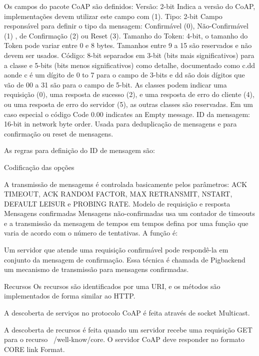 Os campos do pacote CoAP s\~ao definidos:
Vers\~ao: 2-bit Indica a vers\~ao do CoAP, implementa\c{c}\~oes devem utilizar este campo com (1).
Tipo: 2-bit Campo responsável para definir o tipo da mensagem: Confirm\'avel (0), N\~ao-Confirm\'avel (1) , de Confirma\c{c}\~ao (2) ou Reset (3).
Tamanho do Token: 4-bit, o tamanho do Token pode variar entre 0 e 8 bytes. Tamanhos entre 9 a 15 s\~ao reservados e n\~ao devem ser usados.
C\'odigo: 8-bit separados em 3-bit (bits mais significativos) para a classe e 5-bits (bits menos significativos) como detalhe, documentado como c.dd aonde c \'e um d\'igito de 0 to 7 para o campo de 3-bits e dd s\~ao dois d\'igitos que v\~ao de 00 a 31 s\~ao para o campo de 5-bit. As classes podem indicar uma requisi\c{c}\~ao (0), uma resposta de sucesso (2), e uma resposta de erro do cliente (4), ou uma resposta de erro do servidor (5), as outras classes s\~ao reservadas. Em um caso especial o c\'odigo Code 0.00 indicates an Empty message.
ID da mensagem: 16-bit in network byte order. Usada para deduplica\c{c}\~ao de mensagens e para confirmação ou reset de mensagens.

As regras para defini\c{c}\~ao do ID de mensagem s\~ao:
   
Codifica\c{c}\~ao das op\c{c}\~oes

A transmiss\~ao de mensagems \'e controlada basicamente pelos par\^ametros: ACK TIMEOUT, ACK RANDOM FACTOR, MAX RETRANSMIT, NSTART, DEFAULT LEISUR e PROBING RATE.
Modelo de requisi\c{c}\~ao e resposta Mensagens confirmadas Mensagens n\~ao-confirmadas usa um contador de timeouts e a transmiss\~ao da mensagem de tempos em tempos defina por uma fun\c{c}\~ao que varia de acordo com o n\'umero de tentativas. A fun\c{c}\~ao \'e:

Um servidor que atende uma requisi\c{c}\~ao confirm\'avel pode respond\^e-la em conjunto da mensagem de confirma\c{c}\~ao. Essa t\'ecnica \'e chamada de Pigbackend um mecanismo de transmiss\~ao para mensagens confirmadas.\cite{draft-ietf-core-coap-18}

Recursos
Os recursos s\~ao identificados por uma URI, e os m\'etodos s\~ao implementados de forma similar ao HTTP.

A descoberta de servi\c{c}os no protocolo CoAP \'e feita atrav\'es de socket Multicast.

A descoberta de recursos \'e feita quando um servidor recebe uma requisi\c{c}\~ao GET para o recurso ~/well-know/core. O servidor CoAP deve responder no formato CORE link Format.\cite{rfc6690}

